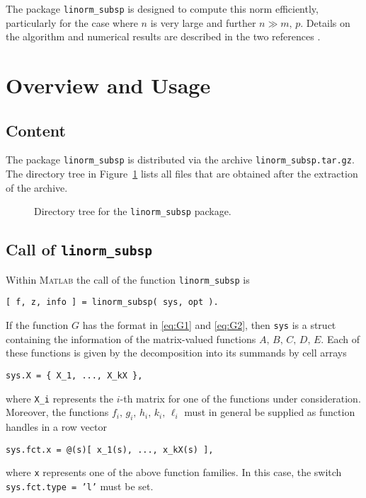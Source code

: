 \documentclass[10pt,a4paper]{article}
\begin{document}
The package \texttt{linorm\_subsp} is designed to compute this norm efficiently, particularly for the case where $n$ is very large and further $n \gg m,\,p$. Details on the algorithm and numerical results are described in the two references \cite{AliBMSV17,SchV18}. 

\section{Overview and Usage}
\subsection{Content}
The package \texttt{linorm\_subsp} is distributed via the archive \texttt{linorm\_subsp.tar.gz}. The directory tree in Figure~\ref{fig:dirtree} lists all files that are obtained after the extraction of the archive. 
\begin{figure}[tb]
\caption{Directory tree for the \texttt{linorm\_subsp} package.}
\label{fig:dirtree}
\end{figure}

\subsection{Call of \texttt{linorm\_subsp}}
Within \textsc{Matlab} the call of the function \texttt{linorm\_subsp} is
\begin{verbatim}
[ f, z, info ] = linorm_subsp( sys, opt ).
\end{verbatim}
If the function $G$ has the format in \eqref{eq:G1} and \eqref{eq:G2}, then \texttt{sys} is a struct containing the information of the matrix-valued functions $A,\,B,\,C,\,D,\,E$. Each of these functions is given by the decomposition into its summands by cell arrays
\begin{verbatim}
sys.X = { X_1, ..., X_kX },
\end{verbatim}
where \texttt{X\_i} represents the $i$-th matrix for one of the functions under consideration. Moreover, the functions $f_i,\,g_i,\,h_i,\,k_i,\,\ell_i$ must in general be supplied as function handles in a row vector
\begin{verbatim}
sys.fct.x = @(s)[ x_1(s), ..., x_kX(s) ], 
\end{verbatim}
where \texttt{x} represents one of the above function families. In this case, the switch \texttt{sys.fct.type = 'l'} must be set.
\end{document}
